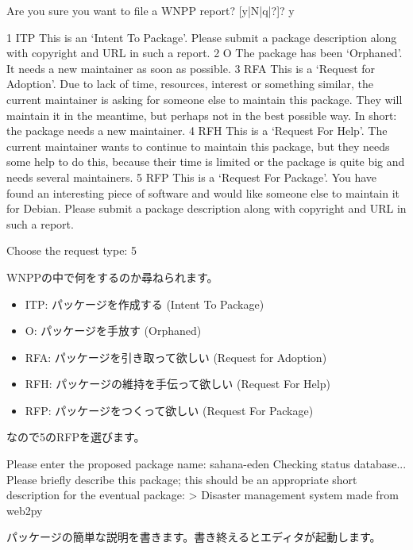 \documentclass[mingoth,a4paper]{jsarticle}
\begin{document}
\begin{commandline}
Are you sure you want to file a WNPP report? [y|N|q|?]? y

1 ITP  This is an `Intent To Package'. Please submit a package description
       along with copyright and URL in such a report.
2 O    The package has been `Orphaned'. It needs a new maintainer as soon as
       possible.
3 RFA  This is a `Request for Adoption'. Due to lack of time, resources,
       interest or something similar, the current maintainer is asking for
       someone else to maintain this package. They will maintain it in the
       meantime, but perhaps not in the best possible way. In short: the
       package needs a new maintainer.
4 RFH  This is a `Request For Help'. The current maintainer wants to continue
       to maintain this package, but they needs some help to do this, because
       their time is limited or the package is quite big and needs several
       maintainers.
5 RFP  This is a `Request For Package'. You have found an interesting piece of
       software and would like someone else to maintain it for Debian. Please
       submit a package description along with copyright and URL in such a
       report.

Choose the request type: 5
\end{commandline}
WNPPの中で何をするのか尋ねられます。

\begin{itemize}
 \item ITP: パッケージを作成する (Intent To Package)
 \item O: パッケージを手放す (Orphaned)
 \item RFA: パッケージを引き取って欲しい (Request for Adoption)
 \item RFH: パッケージの維持を手伝って欲しい (Request For Help)
 \item RFP: パッケージをつくって欲しい (Request For Package)
\end{itemize}

なので5のRFPを選びます。

\begin{commandline}
Please enter the proposed package name: sahana-eden
Checking status database...
Please briefly describe this package; this should be an appropriate short
description for the eventual package:
> Disaster management system made from web2py
\end{commandline}
パッケージの簡単な説明を書きます。書き終えるとエディタが起動します。
\end{document}

